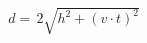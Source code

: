 \documentclass[preview]{standalone}
\begin{document}
\begin{align*}
d =\,2\sqrt{h^2+(v\cdot t)^2}
\end{align*}
\end{document}
